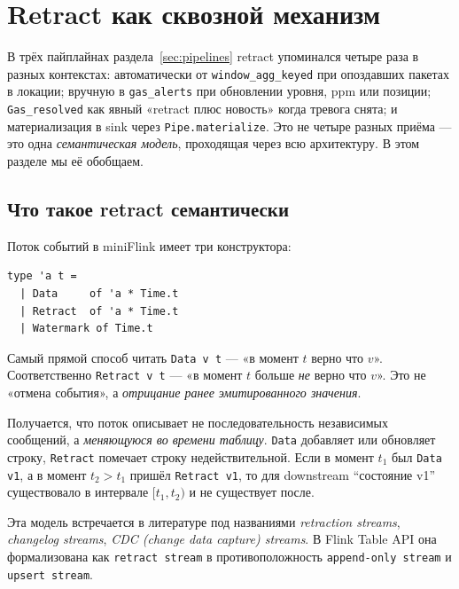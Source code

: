 
\section{Retract как сквозной механизм}\label{sec:retract}

В трёх пайплайнах раздела~\ref{sec:pipelines} retract упоминался
четыре раза в разных контекстах: автоматически от
\texttt{window\_agg\_keyed} при опоздавших пакетах в локации; вручную
в \texttt{gas\_alerts} при обновлении уровня, ppm или позиции;
\texttt{Gas\_resolved} как явный «retract плюс новость» когда
тревога снята; и материализация в sink через
\texttt{Pipe.materialize}. Это не четыре разных приёма --- это одна
\emph{семантическая модель}, проходящая через всю архитектуру. В
этом разделе мы её обобщаем.

\subsection{Что такое retract семантически}

Поток событий в miniFlink имеет три конструктора:

\begin{lstlisting}
type 'a t =
  | Data     of 'a * Time.t
  | Retract  of 'a * Time.t
  | Watermark of Time.t
\end{lstlisting}

Самый прямой способ читать \texttt{Data v t} --- «в момент $t$ верно
что $v$». Соответственно \texttt{Retract v t} --- «в момент $t$
больше \emph{не} верно что $v$». Это не «отмена события», а
\emph{отрицание ранее эмитированного значения}.

Получается, что поток описывает не последовательность независимых
сообщений, а \emph{меняющуюся во времени таблицу}. \texttt{Data}
добавляет или обновляет строку, \texttt{Retract} помечает строку
недействительной. Если в момент $t_1$ был \texttt{Data v1}, а в
момент $t_2 > t_1$ пришёл \texttt{Retract v1}, то для downstream
``состояние v1'' существовало в интервале $[t_1, t_2)$ и не
существует после.

Эта модель встречается в литературе под названиями \emph{retraction
streams}, \emph{changelog streams}, \emph{CDC (change data capture)
streams}. В Flink Table API она формализована как \texttt{retract
stream} в противоположность \texttt{append-only stream} и
\texttt{upsert stream}.

